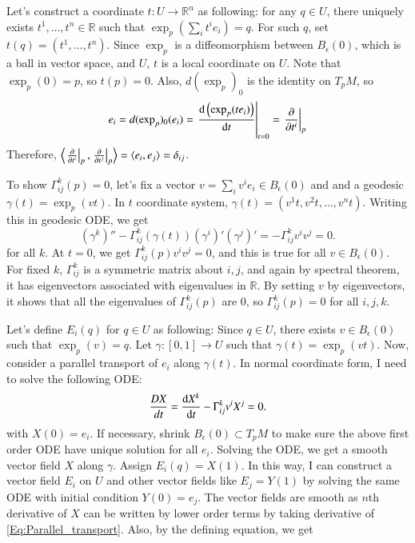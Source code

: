 \documentclass[a4paper, 12pt]{article}
\theoremstyle{Mydefinition}
\theoremstyle{Mytheorem}
\begin{document}
\begin{enumerate}
    Let's construct a coordinate $t:U\rightarrow \mathbb{R}^n$ as following: for any $q\in U$, there uniquely exists $t^1, \ldots ,t^n\in\mathbb{R}$ such that $\exp_p(\sum_i t^i e_i) = q$. For such $q$, set $t(q) = (t^1, \ldots, t^n)$. Since $\exp_p$ is a diffeomorphism between $B_\epsilon(0)$, which is a ball in vector space, and $U$, $t$ is a local coordinate on $U$. Note that $\exp_p(0) = p$, so $t(p) = 0$. Also, $d(\exp_p)_0$ is the identity on $T_pM$, so
    \begin{equation}
    \begin{split}
        e_i = d(\exp_p)_0(e_i) = \left.\dv{\left(\exp_p(t e_i)\right)}{t}\right|_{t=0} = \left.\pdv{t^i}\right|_{p}
    \end{split}
    \end{equation}
    Therefore, $\left\langle \left.\pdv{t^i}\right|_p, \left.\pdv{t^j}\right|_p\right\rangle = \langle e_i, e_j\rangle = \delta_{ij}$.
    
    To show $\Gamma_{ij}^k(p) = 0$, let's fix a vector $v = \sum_{i}v^i e_i\in B_\epsilon(0)$ and and a geodesic $\gamma(t) = \exp_p\left(vt\right)$. In $t$ coordinate system, $\gamma(t) = (v^1 t, v^2t, \ldots, v^n t)$. Writing this in geodesic ODE, we get
    \begin{equation}
        (\gamma^k)'' - \Gamma_{ij}^k(\gamma(t)) (\gamma^i)'(\gamma^j)' = -\Gamma_{ij}^k v^iv^j = 0.
    \end{equation}
    for all $k$. At $t=0$, we get $\Gamma_{ij}^k(p) v^i v^j = 0$, and this is true for all $v\in B_\epsilon(0)$. For fixed $k$, $\Gamma_{ij}^k$ is a symmetric matrix about $i,j$, and again by spectral theorem, it has eigenvectors associated with eigenvalues in $\mathbb{R}$. By setting $v$ by eigenvectors, it shows that all the eigenvalues of $\Gamma_{ij}^k(p)$ are $0$, so $\Gamma_{ij}^k(p) = 0$ for all $i,j,k$.
    
    Let's define $E_i(q)$ for $q\in U$ as following: Since $q\in U$, there exists $v\in B_\epsilon(0)$ such that $\exp_p(v) = q$. Let $\gamma:[0,1]\rightarrow U$ such that $\gamma(t) = \exp_p(vt)$. Now, consider a parallel transport of $e_i$ along $\gamma(t)$. In normal coordinate form, I need to solve the following ODE:
    \begin{equation}\label{Eq:Parallel_transport}
        \frac{DX}{dt} = \dv{X^k}{t} - \Gamma_{ij}^k v^i X^j = 0.
    \end{equation}
    with $X(0) = e_i$. If necessary, shrink $B_\epsilon(0)\subset T_pM$ to make sure the above first order ODE have unique solution for all $e_i$. Solving the ODE, we get a smooth vector field $X$ along $\gamma$. Assign $E_i(q) = X(1)$. In this way, I can construct a vector field $E_i$ on $U$ and other vector fields like $E_j = Y(1)$ by solving the same ODE with initial condition $Y(0) = e_j$. The vector fields are smooth as $n$th derivative of $X$ can be written by lower order terms by taking derivative of \eqref{Eq:Parallel_transport}. Also, by the defining equation, we get
    

\end{enumerate}
\end{document}
